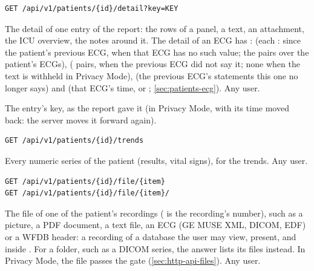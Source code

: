 \begin{lstlisting}[style=signature]
GET /api/v1/patients/{id}/detail?key=KEY
\end{lstlisting}
The detail of one entry of the report: the rows of a panel, a text, an attachment, the ICU
overview, the notes around it. The detail of an ECG has :  (each
:  since the patient's previous ECG,
 when that ECG has no such value;  the  pairs over
the patient's ECGs),  ( pairs,  when the previous
ECG did not say it; none when the text is withheld in Privacy Mode),  (the previous
ECG's statements this one no longer says) and  (that ECG's time, or ;
\cref{sec:patients-ecg}). Any user.
\begin{params}
\item[key] The entry's key, as the report gave it (in Privacy Mode, with its time moved back:
  the server moves it forward again).
\end{params}

\begin{lstlisting}[style=signature]
GET /api/v1/patients/{id}/trends
\end{lstlisting}
Every numeric series of the patient (results, vital signs), for the trends. Any user.

\begin{lstlisting}[style=signature]
GET /api/v1/patients/{id}/file/{item}
GET /api/v1/patients/{id}/file/{item}/
\end{lstlisting}
The file of one of the patient's recordings ( is the recording's number), such as a
picture, a PDF document, a text file, an ECG (GE MUSE XML, DICOM, EDF) or a WFDB header: a
recording of a database the user may view, present, and inside . For a folder,
such as a DICOM series, the answer lists its files instead. In Privacy Mode, the
file passes the gate (\cref{sec:http-api-files}). Any user.

